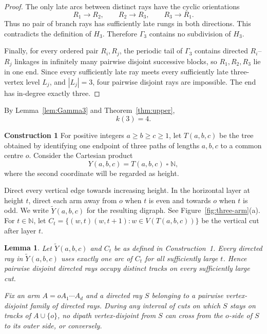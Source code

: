 \documentclass[11pt]{article}
\newtheorem{lemma}[theorem]{Lemma}
\theoremstyle{remark}
\newcommand{\N}{\mathbb{N}}
\numberwithin{equation}{section}
\begin{document}
\begin{proof}
The only late arcs between distinct rays have the cyclic orientations
\[
R_1\to R_2,
\qquad R_2\to R_3,
\qquad R_3\to R_1.
\]
Thus no pair of branch rays has sufficiently late rungs in both directions. This contradicts the definition of $H_3$. Therefore $\Gamma_3$ contains no subdivision of $H_3$.

Finally, for every ordered pair $R_i,R_j$, the periodic tail of $\Gamma_3$ contains directed $R_i$--$R_j$ linkages in infinitely many pairwise disjoint successive blocks, so $R_1,R_2,R_3$ lie in one end. Since every sufficiently late ray meets every sufficiently late three-vertex level $L_j$, and $|L_j|=3$, four pairwise disjoint rays are impossible. The end has in-degree exactly three.
\end{proof}

By Lemma~\ref{lem:Gamma3} and Theorem~\ref{thm:upper},
\begin{equation}\label{eq:k3}
k(3)=4.
\end{equation}


\medskip
\noindent\textbf{Construction 1}
For positive integers $a\ge b\ge c\ge1$, let $T(a,b,c)$ be the tree obtained by identifying one endpoint of three paths of lengths $a,b,c$ to a common centre $o$. Consider the Cartesian product
\[
Y(a,b,c)=T(a,b,c)\mathbin{\square}\N,
\]
where the second coordinate will be regarded as height.

Direct every vertical edge towards increasing height. In the horizontal layer at height $t$, direct each arm away from $o$ when $t$ is even and towards $o$ when $t$ is odd. We write $\widetilde{Y}(a,b,c)$ for the resulting digraph. See Figure~\ref{fig:three-arm}(a). For $t\in\N$, let $C_t=\{(w,t)(w,t+1):w\in V(T(a,b,c))\}$ be the vertical cut after layer $t$.

\begin{lemma}\label{lem:no-passing}
Let $\widetilde{Y}(a,b,c)$ and $C_t$ be as defined in Construction~1. Every directed ray in $\widetilde{Y}(a,b,c)$ uses exactly one arc of $C_t$ for all sufficiently large $t$. Hence pairwise disjoint directed rays occupy distinct tracks on every sufficiently large cut.

Fix an arm $A=oA_1\cdots A_d$ and a directed ray $S$ belonging to a pairwise vertex-disjoint family of directed rays. During any interval of cuts on which $S$ stays on tracks of $A\cup\{o\}$, no dipath vertex-disjoint from $S$ can cross from the $o$-side of $S$ to its outer side, or conversely.
\end{lemma}
\end{document}
